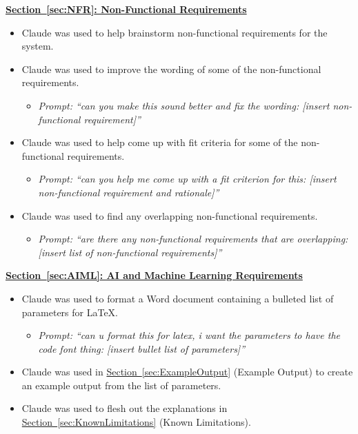 \documentclass[12pt]{article}
\begin{document}
\textbf{\hyperref[sec:NFR]{Section~\ref*{sec:NFR}: Non-Functional Requirements}}
\begin{itemize}
  \item Claude was used to help brainstorm non-functional requirements for the system.
  \item Claude was used to improve the wording of some of the non-functional requirements.
  \begin{itemize}
    \item \textit{Prompt: ``can you make this sound better and fix the wording: [insert non-functional requirement]''}
  \end{itemize}
  \item Claude was used to help come up with fit criteria for some of the non-functional requirements.
  \begin{itemize}
    \item \textit{Prompt: ``can you help me come up with a fit criterion for this: [insert non-functional requirement and rationale]''}
  \end{itemize}
  \item Claude was used to find any overlapping non-functional requirements.
  \begin{itemize}
    \item \textit{Prompt: ``are there any non-functional requirements that are overlapping: [insert list of non-functional requirements]''}
  \end{itemize}
\end{itemize}

\textbf{\hyperref[sec:AIML]{Section~\ref*{sec:AIML}: AI and Machine Learning Requirements}}
\begin{itemize}
  \item Claude was used to format a Word document containing a bulleted list of parameters for \LaTeX{}.
  \begin{itemize}
    \item \textit{Prompt: ``can u format this for latex, i want the parameters to have the code font thing: [insert bullet list of parameters]''}
  \end{itemize}
  \item Claude was used in \hyperref[sec:ExampleOutput]{Section~\ref*{sec:ExampleOutput}} (Example Output) to create an example output from the list of parameters.
  \item Claude was used to flesh out the explanations in \hyperref[sec:KnownLimitations]{Section~\ref*{sec:KnownLimitations}} (Known Limitations).
\end{itemize}
\end{document}
